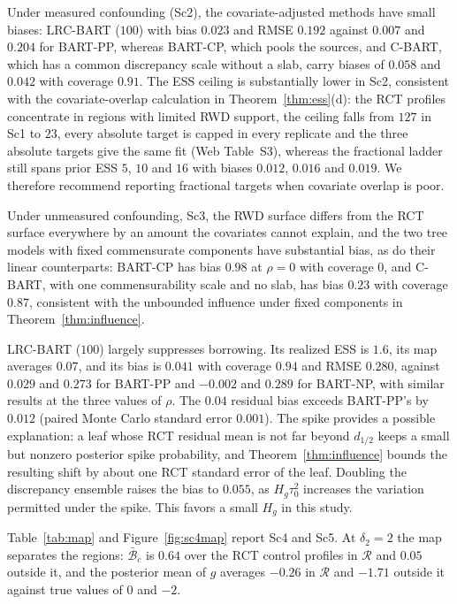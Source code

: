 \documentclass[11pt]{article}
\theoremstyle{definition}
\theoremstyle{plain}
\begin{document}
Under measured confounding (Sc2), the covariate-adjusted methods have small biases: LRC-BART ($100$) with bias $0.023$ and RMSE $0.192$ against $0.007$ and $0.204$ for BART-PP, whereas BART-CP, which pools the sources, and C-BART, which has a common discrepancy scale without a slab, carry biases of $0.058$ and $0.042$ with coverage $0.91$. The ESS ceiling is substantially lower in Sc2, consistent with the covariate-overlap calculation in Theorem~\ref{thm:ess}(d): the RCT profiles concentrate in regions with limited RWD support, the ceiling falls from $127$ in Sc1 to $23$, every absolute target is capped in every replicate and the three absolute targets give the same fit (Web Table~S3), whereas the fractional ladder still spans prior ESS $5$, $10$ and $16$ with biases $0.012$, $0.016$ and $0.019$. We therefore recommend reporting fractional targets when covariate overlap is poor.

Under unmeasured confounding, Sc3, the RWD surface differs from the RCT surface everywhere by an amount the covariates cannot explain, and the two tree models with fixed commensurate components have substantial bias, as do their linear counterparts: BART-CP has bias $0.98$ at $\rho=0$ with coverage $0$, and C-BART, with one commensurability scale and no slab, has bias $0.23$ with coverage $0.87$, consistent with the unbounded influence under fixed components in Theorem~\ref{thm:influence}.

LRC-BART ($100$) largely suppresses borrowing. Its realized ESS is $1.6$, its map averages $0.07$, and its bias is $0.041$ with coverage $0.94$ and RMSE $0.280$, against $0.029$ and $0.273$ for BART-PP and $-0.002$ and $0.289$ for BART-NP, with similar results at the three values of $\rho$. The $0.04$ residual bias exceeds BART-PP's by $0.012$ (paired Monte Carlo standard error $0.001$). The spike provides a possible explanation: a leaf whose RCT residual mean is not far beyond $d_{1/2}$ keeps a small but nonzero posterior spike probability, and Theorem~\ref{thm:influence} bounds the resulting shift by about one RCT standard error of the leaf. Doubling the discrepancy ensemble raises the bias to $0.055$, as $H_g\tau_0^2$ increases the variation permitted under the spike. This favors a small $H_g$ in this study.

Table~\ref{tab:map} and Figure~\ref{fig:sc4map} report Sc4 and Sc5. At $\delta_2=2$ the map separates the regions: $\bar{\mathcal B}_c$ is $0.64$ over the RCT control profiles in $\mathcal R$ and $0.05$ outside it, and the posterior mean of $g$ averages $-0.26$ in $\mathcal R$ and $-1.71$ outside it against true values of $0$ and $-2$.
\end{document}
